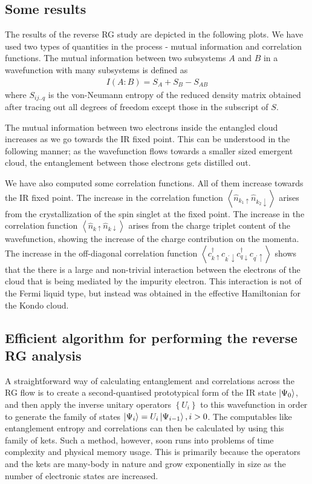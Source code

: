 \subsection{Some results}
The results of the reverse RG study are depicted in the following plots. We have used two types of quantities in the process - mutual information and correlation functions. The mutual information between two subsystems \(A\) and \(B\) in a wavefunction with many subsystems is defined as
\begin{equation}\begin{aligned}
	I(A: B) = S_A + S_B - S_{AB}
\end{aligned}\end{equation}
where \(S_{ij..q}\) is the von-Neumann entropy of the reduced density matrix obtained after tracing out all degrees of freedom except those in the subscript of \(S\).

The mutual information between two electrons inside the entangled cloud increases as we go towards the IR fixed point. This can be understood in the following manner; as the wavefunction flows towards a smaller sized emergent cloud, the entanglement between those electrons gets distilled out.

We have also computed some correlation functions. All of them increase towards the IR fixed point. The increase in the correlation function \(\left<\hat n_{k_1 \uparrow} \hat n_{k_2 \downarrow} \right>\) arises from the crystallization of the spin singlet at the fixed point. The increase in the correlation function \(\left<\hat n_{k \uparrow} \hat n_{k \downarrow} \right>\) arises from the charge triplet content of the wavefunction, showing the increase of the charge contribution on the momenta. The increase in the off-diagonal correlation function \(\left< c^\dagger_{k \uparrow}c_{k^\prime \downarrow}c^\dagger_{q \downarrow}c_{q^\prime \uparrow}\right>\) shows that the there is a large and non-trivial interaction between the electrons of the cloud that is being mediated by the impurity electron. This interaction is not of the Fermi liquid type, but instead was obtained in the effective Hamiltonian for the Kondo cloud. 
\subsection{Efficient algorithm for performing the reverse RG analysis}
A straightforward way of calculating entanglement and correlations across the RG flow is to create a second-quantised prototypical form of the IR state \(\ket{\Psi_0}\), and then apply the inverse unitary operators \(\left\{ U_i \right\} \) to this wavefunction in order to generate the family of states \(\ket{\Psi_i} = U_i \ket{\Psi_{i-1}}, i > 0\). The computables like entanglement entropy and correlations can then be calculated by using this family of kets. Such a method, however, soon runs into problems of time complexity and physical memory usage. This is primarily because the operators and the kets are many-body in nature and grow exponentially in size as the number of electronic states are increased.

